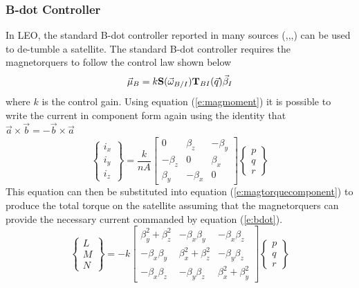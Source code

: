 \documentclass{article}
\begin{document}
\subsubsection{B-dot Controller}

In LEO, the standard B-dot controller reported in many sources
(\cite{Leomanni2012},\cite{Lovera2015},\cite{WInstitute},\cite{SanyalDick})
can be used to de-tumble a satellite. The standard B-dot controller
requires the magnetorquers to follow the control law shown below
\begin{equation}\label{e:bdotcompact}
  \vec{\mu}_B = k{\bf S}(\vec{\omega}_{B/I}){\bf T}_{BI}(\vec{q})\vec{\beta}_I
\end{equation}
where $k$ is the control gain. Using equation (\ref{e:magmoment}) it
is possible to write the current in component form again
using the identity that $\vec{a}\times\vec{b}=-\vec{b}\times\vec{a}$
\begin{equation}\label{e:bdot}
  \begin{Bmatrix} i_{x}
    \\ i_{y} \\ i_{z} \end{Bmatrix} = \frac{k}{nA}\begin{bmatrix} 0 & \beta_z & -\beta_y \\ -\beta_z & 0 &
  \beta_x \\ \beta_y & -\beta_x & 0 \end{bmatrix}\begin{Bmatrix} p
    \\ q \\ r \end{Bmatrix}
\end{equation}
This equation can then be substituted into equation
(\ref{e:magtorquecomponent}) to produce the total torque on the
satellite assuming that the magnetorquers can provide the necessary
current commanded by equation (\ref{e:bdot}).
\begin{equation}\label{e:bdotfinal}
  \begin{Bmatrix} L \\ M \\ N \end{Bmatrix} = -k \begin{bmatrix}
    \beta_y^2 + \beta_z^2 & -\beta_x\beta_y & -\beta_x\beta_z
    \\ -\beta_x\beta_y & \beta_x^2 + \beta_z^2 & -\beta_y\beta_z \\
    -\beta_x\beta_z & -\beta_y\beta_z & \beta_x^2 +
    \beta_y^2 \end{bmatrix} \begin{Bmatrix} p
    \\ q \\ r \end{Bmatrix} 
\end{equation}
\end{document}
